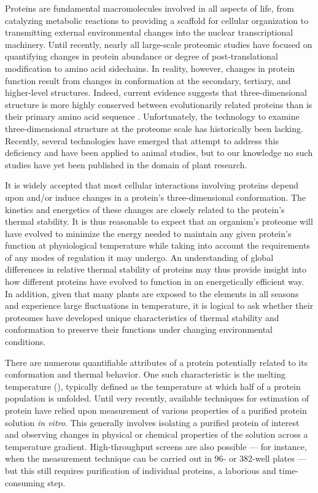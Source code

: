 Proteins are fundamental macromolecules involved in all aspects of life, from
catalyzing metabolic reactions to providing a scaffold for cellular
organization to transmitting external environmental changes into the nuclear
transcriptional machinery. Until recently, nearly all large-scale proteomic
studies have focused on quantifying changes in protein abundance or degree of
post-translational modification to amino acid sidechains. In reality, however,
changes in protein function result from changes in conformation at the
secondary, tertiary, and higher-level structures. Indeed, current evidence
suggests that three-dimensional structure is more highly conserved between
evolutionarily related proteins than is their primary amino acid sequence
\cite{cramer_structural_2001,shih_bacterial_2006,ingles-prieto_conservation_2013}.
Unfortunately, the technology to examine three-dimensional structure at the
proteome scale has historically been lacking. Recently, several technologies
have emerged that attempt to address this deficiency and have been applied to
animal studies, but to our knowledge no such studies have yet been published
in the domain of plant research.

It is widely accepted that most cellular interactions involving proteins
depend upon and/or induce changes in a protein's three-dimensional
conformation. The kinetics and energetics of these changes are closely related
to the protein's thermal stability. It is thus reasonable to expect that an
organism's proteome will have evolved to minimize the energy needed to
maintain any given protein's function at physiological temperature while
taking into account the requirements of any modes of regulation it may
undergo. An understanding of global differences in relative thermal stability
of proteins may thus provide insight into how different proteins have evolved
to function in an energetically efficient way. In addition, given that many
plants are exposed to the elements in all seasons and experience large
fluctuations in temperature, it is logical to ask whether their proteomes have
developed unique characteristics of thermal stability and conformation to
preserve their functions under changing environmental conditions.

There are numerous quantifiable attributes of a protein potentially related to
its conformation and thermal behavior. One such characteristic is the melting
temperature (\Tm{}), typically defined as the temperature at which half of a
protein population is unfolded. Until very recently, available techniques for
estimation of protein \Tm{} have relied upon measurement of various properties
of a purified protein solution \textit{in vitro}. This generally involves
isolating a purified protein of interest and observing changes in physical or
chemical properties of the solution across a temperature gradient.
High-throughput screens are also possible --- for instance, when the
measurement technique can be carried out in 96- or 382-well plates --- but
this still requires purification of individual proteins, a laborious and
time-consuming step.

